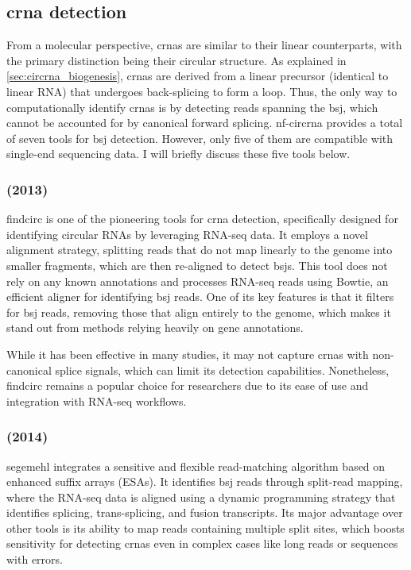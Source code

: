 \subsection{\gls{crna} detection}
\label{subsec:circrna_detection}
From a molecular perspective, \glspl{crna} are similar to their linear
counterparts, with the primary distinction being their circular structure.
As explained in \cref{sec:circrna_biogenesis}, \glspl{crna} are derived from a
linear precursor (identical to linear RNA) that undergoes back-splicing to form
a loop.
Thus, the only way to computationally identify \glspl{crna} is by detecting
reads spanning the \gls{bsj}, which cannot be accounted for by canonical
forward splicing.
\gls{nf-circrna} provides a total of seven tools for \gls{bsj}
detection.
However, only five of them are compatible with single-end sequencing data.
I will briefly discuss these five tools below.

\subsubsection{ (2013)}
\Gls{findcirc} is one of the pioneering tools for \gls{crna} detection,
specifically designed for identifying circular RNAs by leveraging RNA-seq data.
It employs a novel alignment strategy, splitting reads that do not map linearly
to the genome into smaller fragments, which are then re-aligned to detect
\glspl{bsj}\supercite{memczak_circular_2013}.
This tool does not rely on any known annotations and processes RNA-seq reads
using Bowtie, an efficient aligner for identifying \gls{bsj} reads.
One of its key features is that it filters for \gls{bsj} reads, removing those
that align entirely to the genome, which makes it stand out from methods
relying heavily on gene annotations\supercite{memczak_circular_2013}.

While it has been effective in many studies, it may not capture \glspl{crna}
with non-canonical splice signals, which can limit its detection
capabilities\supercite{sekar_circular_2018,liu_prkra_2022}.
Nonetheless, \gls{findcirc} remains a popular choice for researchers due to its
ease of use and integration with RNA-seq workflows.

\subsubsection{ (2014)}
\Gls{segemehl} integrates a sensitive and flexible read-matching algorithm
based on
enhanced suffix arrays (ESAs).
It identifies \gls{bsj} reads through split-read mapping, where the RNA-seq
data is aligned using a dynamic programming strategy that identifies splicing,
trans-splicing, and fusion transcripts.
Its major advantage over other tools is its ability to map reads containing
multiple split sites, which boosts sensitivity for detecting \glspl{crna} even
in complex cases like long reads or sequences with
errors\supercite{hoffmann_multi-split_2014}.

